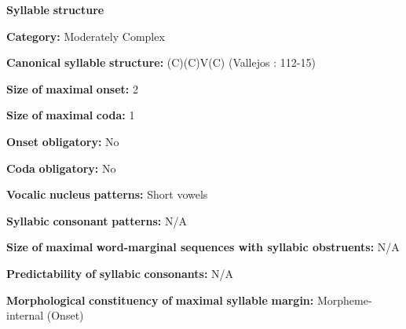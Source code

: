 \begin{styleBody}
\textbf{Syllable} \textbf{structure}
\end{styleBody}

\begin{styleBody}
\textbf{Category:} Moderately Complex
\end{styleBody}

\begin{styleBody}
\textbf{Canonical} \textbf{syllable} \textbf{structure:} (C)(C)V(C) (Vallejos \citealt{Yopán2010}: 112-15)
\end{styleBody}

\begin{styleBody}
\textbf{Size} \textbf{of} \textbf{maximal} \textbf{onset:} 2
\end{styleBody}

\begin{styleBody}
\textbf{Size} \textbf{of} \textbf{maximal} \textbf{coda:} 1
\end{styleBody}

\begin{styleBody}
\textbf{Onset} \textbf{obligatory:} No
\end{styleBody}

\begin{styleBody}
\textbf{Coda} \textbf{obligatory:} No
\end{styleBody}

\begin{styleBody}
\textbf{Vocalic} \textbf{nucleus} \textbf{patterns:} Short vowels
\end{styleBody}

\begin{styleBody}
\textbf{Syllabic} \textbf{consonant} \textbf{patterns:} N/A
\end{styleBody}

\begin{styleBody}
\textbf{Size} \textbf{of} \textbf{maximal} \textbf{word{}-marginal sequences with syllabic obstruents:} N/A
\end{styleBody}

\begin{styleBody}
\textbf{Predictability} \textbf{of} \textbf{syllabic} \textbf{consonants:} N/A
\end{styleBody}

\begin{styleBody}
\textbf{Morphological} \textbf{constituency} \textbf{of} \textbf{maximal} \textbf{syllable} \textbf{margin:} Morpheme-internal (Onset)
\end{styleBody}

